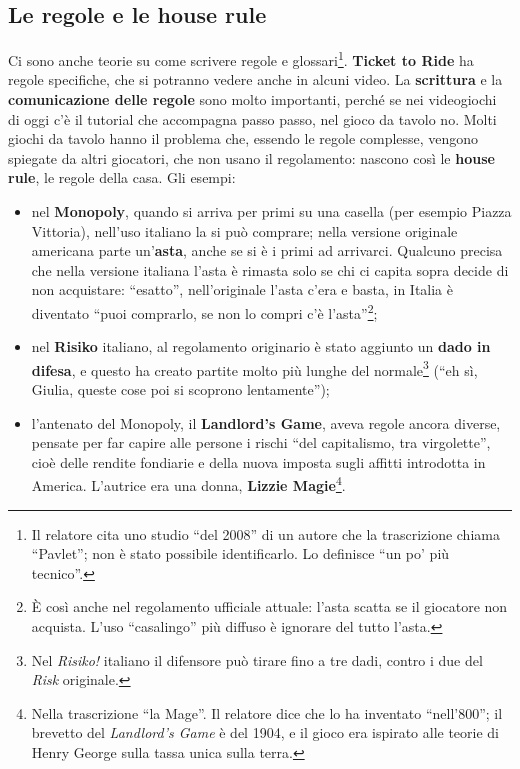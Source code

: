 \subsection{Le regole e le house rule}

Ci sono anche teorie su come scrivere regole e glossari\footnote{Il relatore
cita uno studio ``del 2008'' di un autore che la trascrizione chiama ``Pavlet'';
non è stato possibile identificarlo. Lo definisce ``un po' più tecnico''.}.
\textbf{Ticket to Ride} ha regole specifiche, che si potranno vedere anche in
alcuni video. La \textbf{scrittura} e la \textbf{comunicazione delle regole} sono
molto importanti, perché se nei videogiochi di oggi c'è il tutorial che
accompagna passo passo, nel gioco da tavolo no. Molti giochi da tavolo hanno il
problema che, essendo le regole complesse, vengono spiegate da altri giocatori,
che non usano il regolamento: nascono così le \textbf{house rule}, le regole
della casa. Gli esempi:
\begin{itemize}
  \item nel \textbf{Monopoly}, quando si arriva per primi su una casella (per
        esempio Piazza Vittoria), nell'uso italiano la si può comprare; nella
        versione originale americana parte un'\textbf{asta}, anche se si è i
        primi ad arrivarci. Qualcuno precisa che nella versione italiana
        l'asta è rimasta solo se chi ci capita sopra decide di non acquistare:
        ``esatto'', nell'originale l'asta c'era e basta, in Italia è diventato
        ``puoi comprarlo, se non lo compri c'è l'asta''\footnote{È così anche
        nel regolamento ufficiale attuale: l'asta scatta se il giocatore non
        acquista. L'uso ``casalingo'' più diffuso è ignorare del tutto l'asta.};
  \item nel \textbf{Risiko} italiano, al regolamento originario è stato aggiunto
        un \textbf{dado in difesa}, e questo ha creato partite molto più lunghe
        del normale\footnote{Nel \emph{Risiko!} italiano il difensore può tirare
        fino a tre dadi, contro i due del \emph{Risk} originale.} (``eh sì,
        Giulia, queste cose poi si scoprono lentamente'');
  \item l'antenato del Monopoly, il \textbf{Landlord's Game}, aveva regole ancora
        diverse, pensate per far capire alle persone i rischi ``del capitalismo,
        tra virgolette'', cioè delle rendite fondiarie e della nuova imposta
        sugli affitti introdotta in America. L'autrice era una donna,
        \textbf{Lizzie Magie}\footnote{Nella trascrizione ``la Mage''. Il relatore
        dice che lo ha inventato ``nell'800''; il brevetto del \emph{Landlord's
        Game} è del 1904, e il gioco era ispirato alle teorie di Henry George
        sulla tassa unica sulla terra.}.
\end{itemize}

